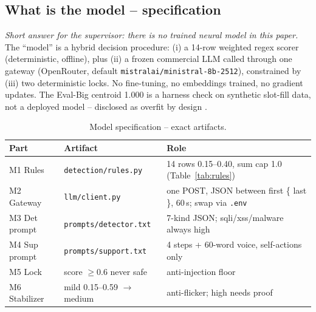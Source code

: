 \documentclass[11pt,a4paper]{article}
\begin{document}
\subsection{What is the model -- specification}
\noindent\textit{Short answer for the supervisor: there is no trained neural model in this paper.} The ``model'' is a hybrid decision procedure: (i) a 14-row weighted regex scorer (deterministic, offline), plus (ii) a frozen commercial LLM called through one gateway (OpenRouter, default \texttt{mistralai/ministral-8b-2512}), constrained by (iii) two deterministic locks. No fine-tuning, no embeddings trained, no gradient updates. The Eval-Big centroid 1.000 is a harness check on synthetic slot-fill data, not a deployed model -- disclosed as overfit by design \cite{FinFraud25,FraudR125}.
\begin{table}[h]\centering\caption{Model specification -- exact artifacts.}\label{tab:model}\begin{tabular}{@{}llp{7cm}@{}} \toprule Part & Artifact & Role\\\midrule
M1 Rules & \texttt{detection/rules.py} & 14 rows 0.15--0.40, sum cap 1.0 (Table~\ref{tab:rules})\\
M2 Gateway & \texttt{llm/client.py} & one POST, JSON between first \{ last \}, 60\,s; swap via \texttt{.env}\\
M3 Det prompt & \texttt{prompts/detector.txt} & 7-kind JSON; sqli/xss/malware always high\\
M4 Sup prompt & \texttt{prompts/support.txt} & 4 steps + 60-word voice, self-actions only\\
M5 Lock & score $\ge$0.6 never safe & anti-injection floor \cite{Hasan25,StruQ24}\\
M6 Stabilizer & mild 0.15--0.59 $\rightarrow$ medium & anti-flicker; high needs proof\\\bottomrule\end{tabular}\end{table}
\end{document}
